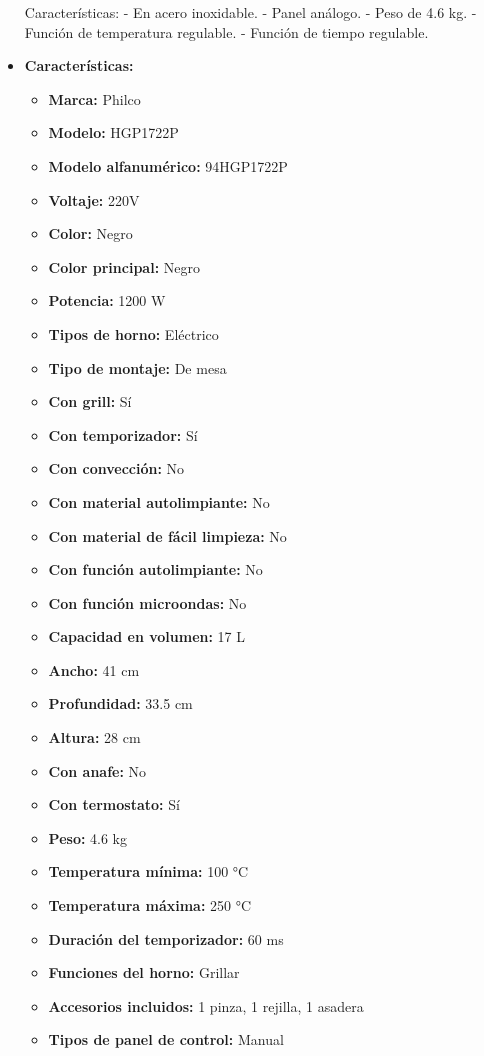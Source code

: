 \documentclass{article}
\begin{document}
\begin{adjustwidth}{2em}{}
\begin{itemize}
Características:
- En acero inoxidable.
- Panel análogo.
- Peso de 4.6 kg.
- Función de temperatura regulable.
- Función de tiempo regulable.
    \item \textbf{Características:} 
    \begin{itemize}
        \item \textbf {Marca:} Philco
    \item \textbf {Modelo:} HGP1722P
    \item \textbf {Modelo alfanumérico:} 94HGP1722P
    \item \textbf {Voltaje:} 220V
    \item \textbf {Color:} Negro
    \item \textbf {Color principal:} Negro
    \item \textbf {Potencia:} 1200 W
    \item \textbf {Tipos de horno:} Eléctrico
    \item \textbf {Tipo de montaje:} De mesa
    \item \textbf {Con grill:} Sí
    \item \textbf {Con temporizador:} Sí
    \item \textbf {Con convección:} No
    \item \textbf {Con material autolimpiante:} No
    \item \textbf {Con material de fácil limpieza:} No
    \item \textbf {Con función autolimpiante:} No
    \item \textbf {Con función microondas:} No
    \item \textbf {Capacidad en volumen:} 17 L
    \item \textbf {Ancho:} 41 cm
    \item \textbf {Profundidad:} 33.5 cm
    \item \textbf {Altura:} 28 cm
    \item \textbf {Con anafe:} No
    \item \textbf {Con termostato:} Sí
    \item \textbf {Peso:} 4.6 kg
    \item \textbf {Temperatura mínima:} 100 °C
    \item \textbf {Temperatura máxima:} 250 °C
    \item \textbf {Duración del temporizador:} 60 ms
    \item \textbf {Funciones del horno:} Grillar
    \item \textbf {Accesorios incluidos:} 1 pinza, 1 rejilla, 1 asadera
    \item \textbf {Tipos de panel de control:} Manual
    \end{itemize}
\end{itemize}

\vspace{1\baselineskip} %
\end{adjustwidth}
\end{document}
